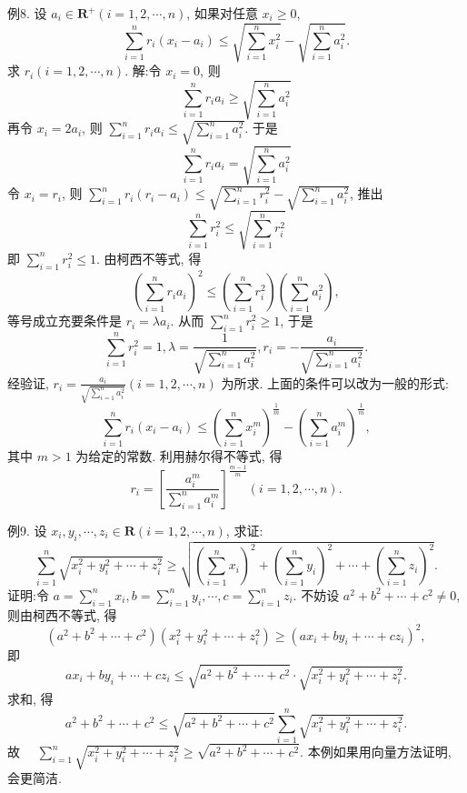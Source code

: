 例8. 设 $a_i \in \mathbf{R}^{+}(i=1,2, \cdots, n)$, 如果对任意 $x_i \geqslant 0$,
$$
\sum_{i=1}^n r_i\left(x_i-a_i\right) \leqslant \sqrt{\sum_{i=1}^n x_i^2}-\sqrt{\sum_{i=1}^n a_i^2} .
$$
求 $r_i(i=1,2, \cdots, n)$.
解:令 $x_i=0$, 则
$$
\sum_{i=1}^n r_i a_i \geqslant \sqrt{\sum_{i=1}^n a_i^2}
$$
再令 $x_i=2 a_i$, 则 $\sum_{i=1}^n r_i a_i \leqslant \sqrt{\sum_{i=1}^n a_i^2}$.
于是
$$
\sum_{i=1}^n r_i a_i=\sqrt{\sum_{i=1}^n a_i^2}
$$
令 $x_i=r_i$, 则 $\sum_{i=1}^n r_i\left(r_i-a_i\right) \leqslant \sqrt{\sum_{i=1}^n r_i^2}-\sqrt{\sum_{i=1}^n a_i^2}$,
推出
$$
\sum_{i=1}^n r_i^2 \leqslant \sqrt{\sum_{i=1}^n r_i^2}
$$
即 $\sum_{i=1}^n r_i^2 \leqslant 1$. 由柯西不等式, 得
$$
\left(\sum_{i=1}^n r_i a_i\right)^2 \leqslant\left(\sum_{i=1}^n r_i^2\right)\left(\sum_{i=1}^n a_i^2\right),
$$
等号成立充要条件是 $r_i=\lambda a_i$.
从而 $\sum_{i=1}^n r_i^2 \geqslant 1$, 于是
$$
\sum_{i=1}^n r_i^2=1, \lambda=\frac{1}{\sqrt{\sum_{i=1}^n a_i^2}}, r_i=-\frac{a_i}{\sqrt{\sum_{i=1}^n a_i^2}} .
$$
经验证, $r_i=\frac{a_i}{\sqrt{\sum_{i=1}^n a_i^2}}(i=1,2, \cdots, n)$ 为所求.
上面的条件可以改为一般的形式:
$$
\sum_{i=1}^n r_i\left(x_i-a_i\right) \leqslant\left(\sum_{i=1}^n x_i^m\right)^{\frac{1}{m}}-\left(\sum_{i=1}^n a_i^m\right)^{\frac{1}{m}},
$$
其中 $m>1$ 为给定的常数.
利用赫尔得不等式, 得
$$
r_i=\left[\frac{a_i^m}{\sum_{i=1}^n a_i^m}\right]^{\frac{m-1}{m}}(i=1,2, \cdots, n) .
$$



例9. 设 $x_i, y_i, \cdots, z_i \in \mathbf{R}(i=1,2, \cdots, n)$, 求证:
$$
\sum_{i=1}^n \sqrt{x_i^2+y_i^2+\cdots+z_i^2} \geqslant \sqrt{\left(\sum_{i=1}^n x_i\right)^2+\left(\sum_{i=1}^n y_i\right)^2+\cdots+\left(\sum_{i=1}^n z_i\right)^2} .
$$
证明:令 $a=\sum_{i=1}^n x_i, b=\sum_{i=1}^n y_i, \cdots, c=\sum_{i=1}^n z_i$. 不妨设 $a^2+b^2+\cdots+ c^2 \neq 0$, 则由柯西不等式, 得
$$
\left(a^2+b^2+\cdots+c^2\right)\left(x_i^2+y_i^2+\cdots+z_i^2\right) \geqslant\left(a x_i+b y_i+\cdots+c z_i\right)^2,
$$
即
$$
a x_i+b y_i+\cdots+c z_i \leqslant \sqrt{a^2+b^2+\cdots+c^2} \cdot \sqrt{x_i^2+y_i^2+\cdots+z_i^2} .
$$
求和, 得
$$
a^2+b^2+\cdots+c^2 \leqslant \sqrt{a^2+b^2+\cdots+c^2} \sum_{i=1}^n \sqrt{x_i^2+y_i^2+\cdots+z_i^2} .
$$
故 $\quad \sum_{i=1}^n \sqrt{x_i^2+y_i^2+\cdots+z_i^2} \geqslant \sqrt{a^2+b^2+\cdots+c^2}$.
本例如果用向量方法证明, 会更简洁.



